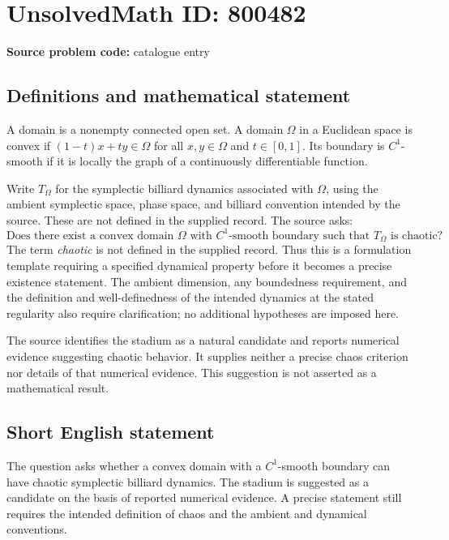 \documentclass[11pt]{article}
\begin{document}
\section*{UnsolvedMath ID: 800482}
\textbf{Source problem code:} catalogue entry
\subsection{Definitions and mathematical statement}
A domain is a nonempty connected open set. A domain \(\Omega\) in a Euclidean space is convex if \((1-t)x+ty\in\Omega\) for all \(x,y\in\Omega\) and \(t\in[0,1]\). Its boundary is \(C^1\)-smooth if it is locally the graph of a continuously differentiable function.

Write \(T_\Omega\) for the symplectic billiard dynamics associated with \(\Omega\), using the ambient symplectic space, phase space, and billiard convention intended by the source. These are not defined in the supplied record. The source asks:
\[
\text{Does there exist a convex domain }\Omega\text{ with }C^1\text{-smooth boundary such that }T_\Omega\text{ is chaotic?}
\]
The term \emph{chaotic} is not defined in the supplied record. Thus this is a formulation template requiring a specified dynamical property before it becomes a precise existence statement. The ambient dimension, any boundedness requirement, and the definition and well-definedness of the intended dynamics at the stated regularity also require clarification; no additional hypotheses are imposed here.

The source identifies the stadium as a natural candidate and reports numerical evidence suggesting chaotic behavior. It supplies neither a precise chaos criterion nor details of that numerical evidence. This suggestion is not asserted as a mathematical result.
\subsection{Short English statement}
The question asks whether a convex domain with a \(C^1\)-smooth boundary can have chaotic symplectic billiard dynamics. The stadium is suggested as a candidate on the basis of reported numerical evidence. A precise statement still requires the intended definition of chaos and the ambient and dynamical conventions.
\end{document}
